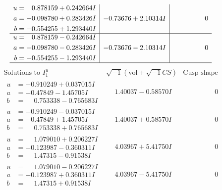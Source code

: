 \documentclass[1p]{elsarticle_modified}
\theoremstyle{definition}
\newcommand{\I}{\sqrt{-1}}
\begin{document}
$$\begin{array}{c|c|c}
\begin{aligned}
u &= \phantom{-}0.878159 + 0.242664 I \\
a &= -0.098780 + 0.283426 I \\
b &= -0.554255 + 1.293440 I\end{aligned}
 & -0.73676 + 2.10314 I & \phantom{-0.000000 } 0 \\ \hline\begin{aligned}
u &= \phantom{-}0.878159 - 0.242664 I \\
a &= -0.098780 - 0.283426 I \\
b &= -0.554255 - 1.293440 I\end{aligned}
 & -0.73676 - 2.10314 I & \phantom{-0.000000 } 0\\
 \hline 
 \end{array}$$\newpage$$\begin{array}{c|c|c}  
\text{Solutions to }I^u_{1}& \I (\text{vol} + \sqrt{-1}CS) & \text{Cusp shape}\\
 \hline 
\begin{aligned}
u &= -0.910249 + 0.037015 I \\
a &= -0.47849 - 1.45705 I \\
b &= \phantom{-}0.753338 - 0.765683 I\end{aligned}
 & \phantom{-}1.40037 - 0.58570 I & \phantom{-0.000000 } 0 \\ \hline\begin{aligned}
u &= -0.910249 - 0.037015 I \\
a &= -0.47849 + 1.45705 I \\
b &= \phantom{-}0.753338 + 0.765683 I\end{aligned}
 & \phantom{-}1.40037 + 0.58570 I & \phantom{-0.000000 } 0 \\ \hline\begin{aligned}
u &= \phantom{-}1.079010 + 0.206227 I \\
a &= -0.123987 - 0.360311 I \\
b &= \phantom{-}1.47315 - 0.91538 I\end{aligned}
 & \phantom{-}4.03967 + 5.41750 I & \phantom{-0.000000 } 0 \\ \hline\begin{aligned}
u &= \phantom{-}1.079010 - 0.206227 I \\
a &= -0.123987 + 0.360311 I \\
b &= \phantom{-}1.47315 + 0.91538 I\end{aligned}
 & \phantom{-}4.03967 - 5.41750 I & \phantom{-0.000000 } 0 \\ \hline\begin{aligned}

\end{aligned}
\end{array}$$
\end{document}
